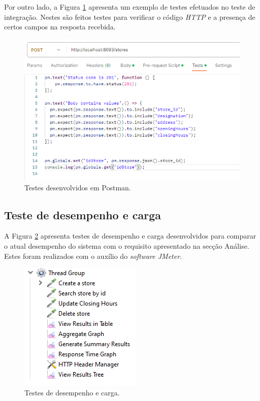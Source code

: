 Por outro lado, a Figura \ref{fig:testesPostman1} apresenta um exemplo de testes efetuados no teste de integração. Nestes são feitos testes para verificar o código \textit{HTTP} e a presença de certos campos na resposta recebida. 

\begin{figure}[H]
	\centering
	\includegraphics[scale=0.8]{figures/testesPostman1.png}
	\caption{Testes desenvolvidos em Postman.}
	\label{fig:testesPostman1}
\end{figure}

\subsection{Teste de desempenho e carga}

A Figura \ref{fig:testesCarga} apresenta testes de desempenho e carga desenvolvidos para comparar o atual desempenho do sistema com o requisito apresentado na secção Análise. Estes foram realizados com o auxílio do \textit{software JMeter}.

\begin{figure}[H]
	\centering
	\includegraphics[scale=0.8]{figures/testesCarga.png}
	\caption{Testes de desempenho e carga.}
	\label{fig:testesCarga}
\end{figure}

